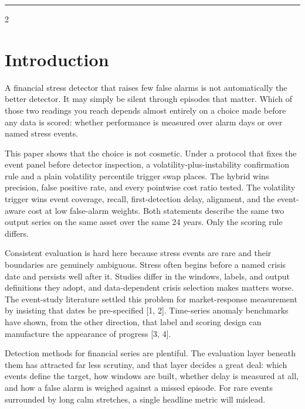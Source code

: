 \documentclass{book}
\begin{document}
\noindent \rule{\textwidth}{1pt}
\parskip=0pt
\columnseprule=0pt
\setlength{\columnsep}{1.5em}
\vspace{-12pt}
\begin{multicols}{2}
\section{Introduction}
\vspace{-6pt}
A financial stress detector that raises few false alarms is not automatically the better detector. It may simply be silent through episodes that matter. Which of those two readings you reach depends almost entirely on a choice made before any data is scored: whether performance is measured over alarm days or over named stress events.

This paper shows that the choice is not cosmetic. Under a protocol that fixes the event panel before detector inspection, a volatility-plus-instability confirmation rule and a plain volatility percentile trigger swap places. The hybrid wins precision, false positive rate, and every pointwise cost ratio tested. The volatility trigger wins event coverage, recall, first-detection delay, alignment, and the event-aware cost at low false-alarm weights. Both statements describe the same two output series on the same asset over the same 24 years. Only the scoring rule differs.

Consistent evaluation is hard here because stress events are rare and their boundaries are genuinely ambiguous. Stress often begins before a named crisis date and persists well after it. Studies differ in the windows, labels, and output definitions they adopt, and data-dependent crisis selection makes matters worse. The event-study literature settled this problem for market-response measurement by insisting that dates be pre-specified [1, 2]. Time-series anomaly benchmarks have shown, from the other direction, that label and scoring design can manufacture the appearance of progress [3, 4].

Detection methods for financial series are plentiful. The evaluation layer beneath them has attracted far less scrutiny, and that layer decides a great deal: which events define the target, how windows are built, whether delay is measured at all, and how a false alarm is weighed against a missed episode. For rare events surrounded by long calm stretches, a single headline metric will mislead.


\end{multicols}
\end{document}
